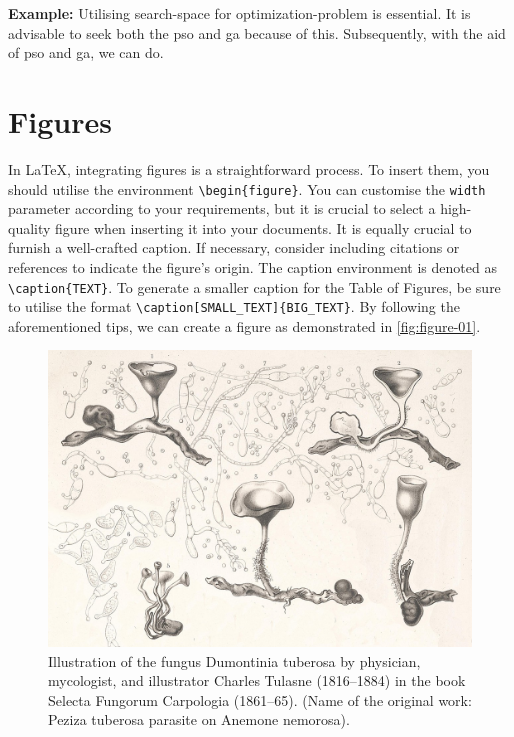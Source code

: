 {\vspace{.875em}
\textbf{Example:} Utilising \Gls{search-space} for \Gls{optimization-problem} is essential. It is advisable to seek both the \acrfull{pso} and \acrfull{ga} because of this. Subsequently, with the aid of \acrshort{pso} and \acrshort{ga}, we can do.

\section{Figures}
In \LaTeX, integrating figures is a straightforward process. To insert them, you should utilise the environment \verb|\begin{figure}|. You can customise the \verb|width| parameter according to your requirements, but it is crucial to select a high-quality figure when inserting it into your documents. It is equally crucial to furnish a well-crafted caption. If necessary, consider including citations or references to indicate the figure's origin. The caption environment is denoted as \verb|\caption{TEXT}|. To generate a smaller caption for the Table of Figures, be sure to utilise the format \verb|\caption[SMALL_TEXT]{BIG_TEXT}|. By following the aforementioned tips, we can create a figure as demonstrated in \autoref{fig:figure-01}.

\begin{figure}[!htpb]
    \centering
    \includegraphics[width=\linewidth]{Figures/PezizaTuberosa.jpg}
    \caption[Illustration of the fungus Dumontinia tuberosa.]{Illustration of the fungus Dumontinia tuberosa by physician, mycologist, and illustrator Charles Tulasne (1816–1884) in the book Selecta Fungorum Carpologia (1861–65). (Name of the original work: Peziza tuberosa parasite on Anemone nemorosa).}
    \label{fig:figure-01}
\end{figure}

}

